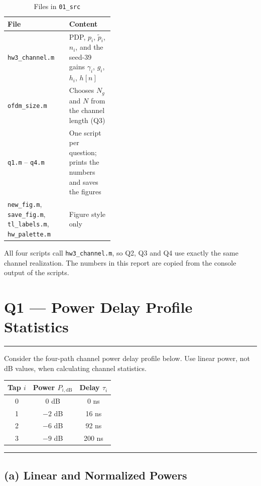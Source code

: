 \documentclass[12pt,a4paper]{report}
\newcommand{\question}[1]{%
    \hrule
    \vspace{0.2cm}
    #1
    \vspace{0.2cm}
    \hrule
    \vspace{0.5cm}
}
\begin{document}
\begin{table}[H]
\centering
\caption{Files in \texttt{01\_src}}
\setlength{\tabcolsep}{8pt}
\renewcommand{\arraystretch}{1.2}
\begin{tabular}{l>{\raggedright\arraybackslash}p{0.42\linewidth}}
\toprule
\textbf{File} & \textbf{Content} \\
\midrule
\texttt{hw3\_channel.m} & PDP, $p_i$, $\tilde p_i$, $n_i$, and the seed-39 gains $\gamma_i$, $g_i$, $h_i$, $h[n]$ \\
\texttt{ofdm\_size.m}   & Chooses $N_g$ and $N$ from the channel length (Q3) \\
\texttt{q1.m} -- \texttt{q4.m} & One script per question; prints the numbers and saves the figures \\
\makecell[l]{\texttt{new\_fig.m}, \texttt{save\_fig.m}, \\ \texttt{tl\_labels.m}, \texttt{hw\_palette.m}} & Figure style only \\
\bottomrule
\end{tabular}
\end{table}

All four scripts call \texttt{hw3\_channel.m}, so Q2, Q3 and Q4 use exactly the same channel realization. The
numbers in this report are copied from the console output of the scripts.

\newpage

\chapter{Q1 — Power Delay Profile Statistics}
\question{Consider the four-path channel power delay profile below. Use linear power, not dB values, when calculating
channel statistics.
\begin{center}
\begin{tabular}{ccc}
\toprule
Tap $i$ & Power $P_{i,\mathrm{dB}}$ & Delay $\tau_i$ \\
\midrule
0 & 0 dB & 0 ns \\
1 & $-2$ dB & 16 ns \\
2 & $-6$ dB & 92 ns \\
3 & $-9$ dB & 200 ns \\
\bottomrule
\end{tabular}
\end{center}}

\section{(a) Linear and Normalized Powers}
\end{document}
